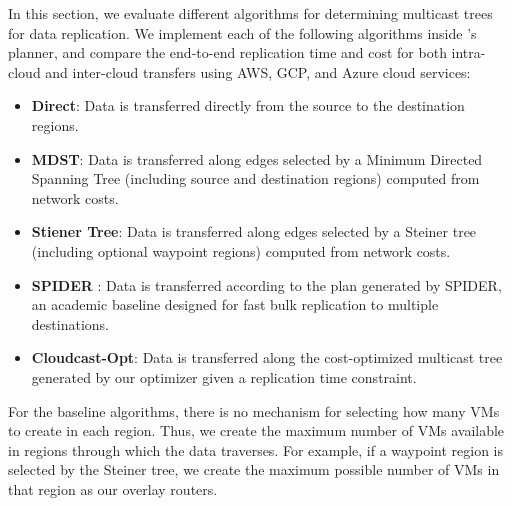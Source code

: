 In this section, we evaluate different algorithms for determining multicast trees for data replication. We implement each of the following algorithms inside \sys{}'s planner, and compare the end-to-end replication time and cost for both intra-cloud and inter-cloud transfers using AWS, GCP, and Azure cloud services:  
\begin{itemize}
    \item \textbf{Direct}: Data is transferred directly from the source to the destination regions.  
    \item \textbf{MDST}: Data is transferred along edges selected by a Minimum Directed Spanning Tree (including source and destination regions) computed from network costs. 
    \item \textbf{Stiener Tree}: Data is transferred along edges selected by a Steiner tree (including optional waypoint regions) computed from network costs. 
    \item \textbf{SPIDER} \cite{ganguly2005fast}: Data is transferred according to the plan generated by SPIDER, an academic baseline designed for fast bulk replication to multiple destinations.
    \item \textbf{Cloudcast-Opt}: Data is transferred along the cost-optimized multicast tree generated by our optimizer given a replication time constraint. 
\end{itemize}

For the baseline algorithms, there is no mechanism for selecting how many VMs to create in each region. Thus, we create the maximum number of VMs available in regions through which the data traverses. For example, if a waypoint region is selected by the Steiner tree, we create the maximum possible number of VMs in that region as our overlay routers.  

